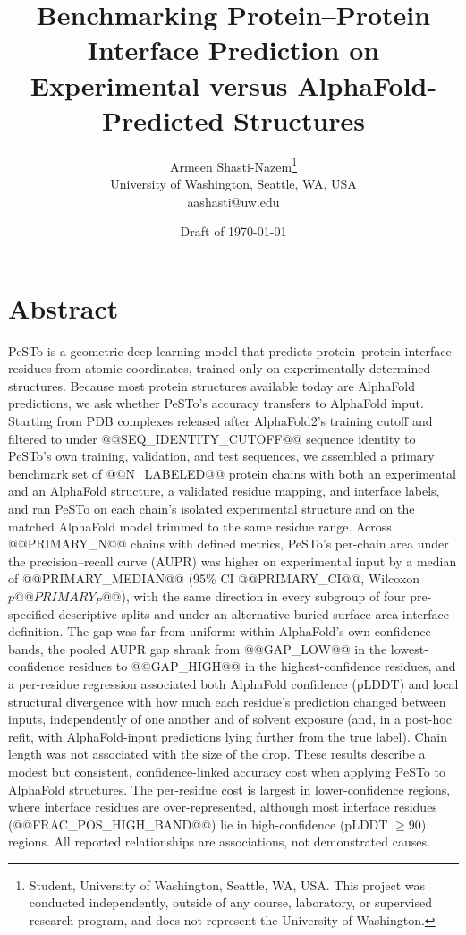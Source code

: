 \documentclass[10pt]{article}
\title{\vspace{-1.5em}\textbf{Benchmarking Protein--Protein Interface Prediction on Experimental versus AlphaFold-Predicted Structures}}
\author{Armeen Shasti-Nazem\thanks{Student, University of Washington,
Seattle, WA, USA. This project was conducted independently, outside of any
course, laboratory, or supervised research program, and does not represent
the University of Washington.}\\[2pt]
\small University of Washington, Seattle, WA, USA\\[1pt]
\small\href{mailto:aashasti@uw.edu}{aashasti@uw.edu}}
\date{\small Draft of \today}
\begin{document}
\maketitle
\thispagestyle{fancy}
\vspace{-2.2em}

\section*{Abstract}

PeSTo is a geometric deep-learning model that predicts protein--protein
interface residues from atomic coordinates, trained only on experimentally
determined structures. Because most protein structures available today are
AlphaFold predictions, we ask whether PeSTo's accuracy transfers to AlphaFold
input. Starting from PDB complexes released after AlphaFold2's training
cutoff and filtered to under @@SEQ_IDENTITY_CUTOFF@@ sequence identity to
PeSTo's own training, validation, and test sequences, we assembled a primary
benchmark set of @@N_LABELED@@ protein chains with both an experimental and
an AlphaFold structure, a validated residue mapping, and interface labels,
and ran PeSTo on each chain's isolated experimental structure and on the
matched AlphaFold model trimmed to the same residue range. Across
@@PRIMARY_N@@ chains with defined metrics, PeSTo's
per-chain area under the precision--recall curve (AUPR) was higher on
experimental input by a median of @@PRIMARY_MEDIAN@@ (95\% CI
@@PRIMARY_CI@@, Wilcoxon $p @@PRIMARY_P@@$), with the same direction in
every subgroup of four pre-specified descriptive splits and under an
alternative buried-surface-area interface definition. The gap was far from
uniform: within AlphaFold's own confidence bands, the pooled AUPR gap shrank
from @@GAP_LOW@@ in the lowest-confidence residues to @@GAP_HIGH@@ in the
highest-confidence residues, and a per-residue regression associated both
AlphaFold confidence (pLDDT) and local structural divergence with how much
each residue's prediction changed between inputs, independently of one
another and of solvent exposure (and, in a post-hoc refit, with
AlphaFold-input predictions lying further from the true label). Chain length was not associated with the
size of the drop. These results describe a modest but consistent,
confidence-linked accuracy cost when applying PeSTo to AlphaFold structures.
The per-residue cost is largest in lower-confidence regions, where interface
residues are over-represented, although most interface residues
(@@FRAC_POS_HIGH_BAND@@) lie in high-confidence (pLDDT $\geq 90$) regions. All
reported relationships are associations, not demonstrated causes.
\end{document}
